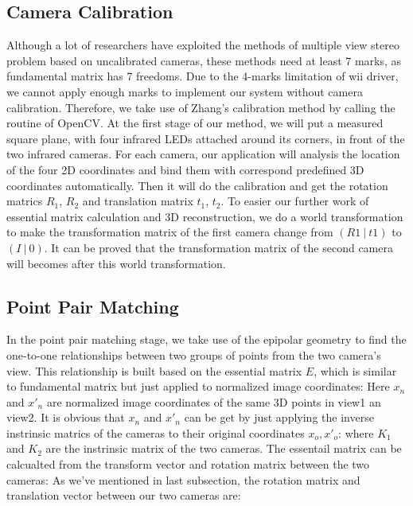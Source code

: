 \documentclass[10pt,twocolumn,letterpaper]{article}
\begin{document}
\subsection{Camera Calibration}
Although a lot of researchers have exploited the methods of multiple view stereo problem based on uncalibrated cameras, these methods need at least 7 marks\cite{7points}, as fundamental matrix has 7 freedoms. Due to the 4-marks limitation of wii driver, we cannot apply enough marks to implement our system without camera calibration. Therefore, we take use of Zhang's calibration method by calling the routine of OpenCV. At the first stage of our method, we will put a measured square plane, with four infrared LEDs attached around its corners, in front of the two infrared cameras. For each camera, our application will analysis the location of the four 2D coordinates and bind them with correspond predefined 3D coordinates automatically. Then it will do the calibration and get the rotation matrics $R_{1}$, $R_{2}$ and translation matrix $t_{1}$, $t_{2}$. To easier our further work of essential matrix calculation and 3D reconstruction, we do a world transformation to make the transformation matrix of the first camera change from $( R1~ | ~t1 )$ to $( I~ | ~0 )$. It can be proved that the transformation matrix of the second camera will becomes 
\endequation after this world transformation. 

\subsection{Point Pair Matching}
In the point pair matching stage, we take use of the epipolar geometry to find the one-to-one relationships between two groups of points from the two camera's view. This relationship is built based on the essential matrix $E$, which is similar to fundamental matrix but just applied to normalized image coordinates: \endequation Here $x_{n}$ and $x'_{n}$ are normalized image coordinates of the same 3D points in view1 an view2. It is obvious that $x_{n}$ and $x'_{n}$ can be get by just applying the inverse instrinsic matrics of the cameras to their original coordinates $x_{o}, x'_{o}$: \endequation where $K_{1}$ and $K_{2}$ are the instrinsic matrix of the two cameras.
The essentail matrix can be calcualted from the transform vector and rotation matrix between the two cameras: \endequation
As we've mentioned in last subsection, the rotation matrix and translation vector between our two cameras are: \endequation {}\endequation 
\end{document}
